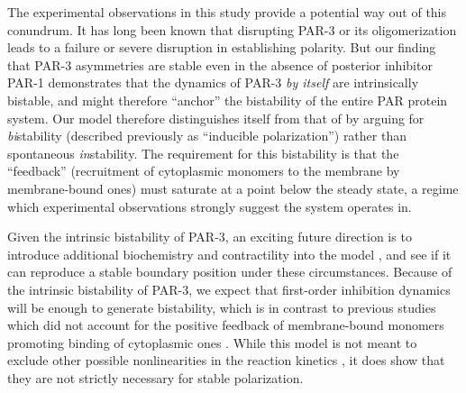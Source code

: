 \documentclass[11pt]{article}
\newcommand{\6}[1]{#1_{\text{6}}}
\newcommand{\3}[1]{#1_{\text{3}}}
\begin{document}
The experimental observations in this study provide a potential way out of this conundrum. It has long been known that disrupting PAR-3 \cite{etemad1995asymmetrically} or its oligomerization \cite{dickinson2017single} leads to a failure or severe disruption in establishing polarity. But our finding that PAR-3 asymmetries are stable even in the absence of posterior inhibitor PAR-1 \cite{sailer2015dynamic} demonstrates that the dynamics of PAR-3 \emph{by itself} are intrinsically bistable, and might therefore ``anchor'' the bistability of the entire PAR protein system. Our model therefore distinguishes itself from that of \cite{lang2022oligomerization} by arguing for \emph{bi}stability (described previously as ``inducible polarization'') rather than spontaneous \emph{in}stability. The requirement for this bistability is that the ``feedback'' (recruitment of cytoplasmic monomers to the membrane by membrane-bound ones) must saturate at a point below the steady state, a regime which experimental observations strongly suggest the system operates in.

Given the intrinsic bistability of PAR-3, an exciting future direction is to introduce additional biochemistry and contractility into the model \cite{sailer2015dynamic}, and see if it can reproduce a stable boundary position under these circumstances. Because of the intrinsic bistability of PAR-3, we expect that first-order inhibition dynamics will be enough to generate bistability, which is in contrast to previous studies which did not account for the positive feedback of membrane-bound monomers promoting binding of cytoplasmic ones \cite{dawes20113}. While this model is not meant to exclude other possible nonlinearities in the reaction kinetics \cite{bland2023optimized}, it does show that they are not strictly necessary for stable polarization.





\end{document}

